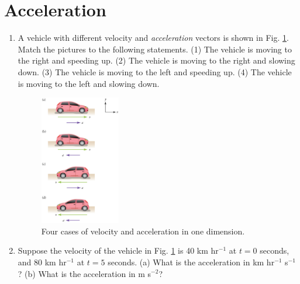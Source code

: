 \documentclass{article}
\begin{document}
\section{Acceleration}

\begin{enumerate}
\item A vehicle with different velocity and \textit{acceleration} vectors is shown in Fig. \ref{fig:vehicle_v_a}.  Match the pictures to the following statements.  (1) The vehicle is moving to the right and speeding up.  (2) The vehicle is moving to the right and slowing down.  (3) The vehicle is moving to the left and speeding up. (4) The vehicle is moving to the left and slowing down.
\begin{figure}[hb]
\centering
\includegraphics[width=0.33\textwidth,trim=0cm 0cm 1.75cm 0cm,clip=true]{figures/vehicle_v_a.jpeg}
\caption{\label{fig:vehicle_v_a} Four cases of velocity and acceleration in one dimension.}
\end{figure}
\item Suppose the velocity of the vehicle in Fig. \ref{fig:vehicle_v_a} is 40 km hr$^{-1}$ at $t=0$ seconds, and 80 km hr$^{-1}$ at $t=5$ seconds. (a) What is the acceleration in km hr$^{-1}$ s$^{-1}$? (b) What is the acceleration in m s$^{-2}$?
\end{enumerate}
\end{document}
